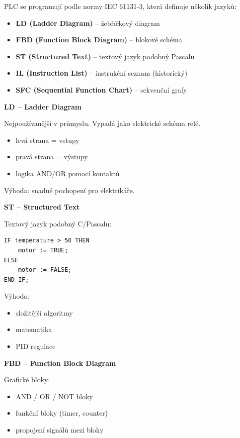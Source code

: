 \documentclass[a4paper,10pt]{article}
\begin{document}
\begin{vysvetlenibox}
PLC se programují podle normy IEC 61131-3, která definuje několik jazyků:

\begin{itemize}
\item \textbf{LD (Ladder Diagram)} – žebříčkový diagram
\item \textbf{FBD (Function Block Diagram)} – blokové schéma
\item \textbf{ST (Structured Text)} – textový jazyk podobný Pascalu
\item \textbf{IL (Instruction List)} – instrukční seznam (historický)
\item \textbf{SFC (Sequential Function Chart)} – sekvenční grafy
\end{itemize}

\textbf{LD – Ladder Diagram}

Nejpoužívanější v průmyslu. Vypadá jako elektrické schéma relé.

\begin{itemize}
\item levá strana = vstupy
\item pravá strana = výstupy
\item logika AND/OR pomocí kontaktů
\end{itemize}

Výhoda: snadné pochopení pro elektrikáře.

\textbf{ST – Structured Text}

Textový jazyk podobný C/Pascalu:

\begin{vzorcebox}
\begin{verbatim}
IF temperature > 50 THEN
    motor := TRUE;
ELSE
    motor := FALSE;
END_IF;
\end{verbatim}
\end{vzorcebox}

Výhoda:
\begin{itemize}
\item složitější algoritmy
\item matematika
\item PID regulace
\end{itemize}

\textbf{FBD – Function Block Diagram}

Grafické bloky:

\begin{itemize}
\item AND / OR / NOT bloky
\item funkční bloky (timer, counter)
\item propojení signálů mezi bloky
\end{itemize}


\end{vysvetlenibox}
\end{document}
